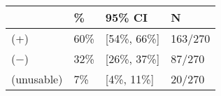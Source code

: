 \begin{tabular}{llll}
\hline
& \% & 95\% CI  & N \\
\hline
(+) & 60\% & [54\%, 66\%] & 163/270\\
($-$) & 32\% & [26\%, 37\%] & 87/270\\
(unusable) & 7\% & [4\%, 11\%] & 20/270\\
\hline
\end{tabular}
